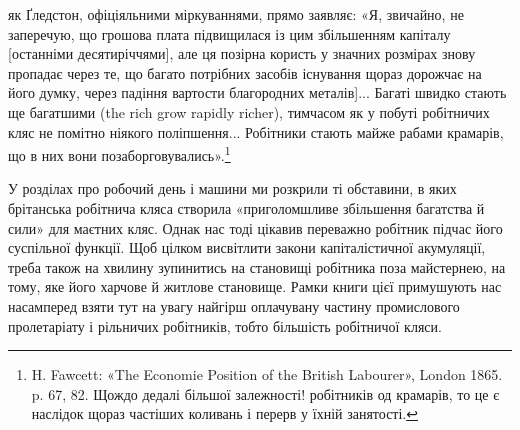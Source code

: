 як Ґледстон, офіціяльними міркуваннями, прямо заявляє:
«Я, звичайно, не заперечую, що грошова плата підвищилася із
цим збільшенням капіталу [останніми десятиріччями], але ця
позірна користь у значних розмірах знову пропадає через те,
що багато потрібних засобів існування щораз дорожчає на його
думку, через падіння вартости благородних металів]... Багаті
швидко стають ще багатшими (the rich grow rapidly richer),
тимчасом як у побуті робітничих кляс не помітно ніякого поліпшення...
Робітники стають майже рабами крамарів, що в них
вони позаборговувались».\footnote{
H. Fawcett: «The Economie Position of the British Labourer»,
London 1865. p. 67, 82. Щождо дедалі більшої залежності! робітників од
крамарів, то це є наслідок щораз частіших коливань і перерв у їхній
занятості.
}

У розділах про робочий день і машини ми розкрили ті обставини,
в яких брітанська робітнича кляса створила «приголомшливе
збільшення багатства й сили» для маєтних кляс. Однак
нас тоді цікавив переважно робітник підчас його суспільної
функції. Щоб цілком висвітлити закони капіталістичної акумуляції,
треба також на хвилину зупинитись на становищі робітника
поза майстернею, на тому, яке його харчове й житлове становище.
Рамки книги цієї примушують нас насамперед взяти тут на увагу
найгірш оплачувану частину промислового пролетаріату і рільничих
робітників, тобто більшість робітничої кляси.
